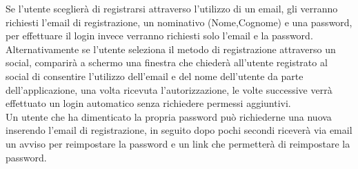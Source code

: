 Se l'utente sceglierà di registrarsi attraverso l'utilizzo di un email, gli verranno richiesti l'email di registrazione, un nominativo (Nome,Cognome) e una password, per effettuare il login invece verranno richiesti solo l'email e la password.\\
Alternativamente se l'utente seleziona il metodo di registrazione attraverso un social, comparirà a schermo una finestra che chiederà all'utente registrato al social di consentire l'utilizzo dell'email e del nome dell'utente da parte dell'applicazione, una volta ricevuta l'autorizzazione, le volte successive verrà effettuato un login automatico senza richiedere permessi aggiuntivi.\\
Un utente che ha dimenticato la propria password può richiederne una nuova inserendo l'email di registrazione, in seguito dopo pochi secondi riceverà via email un avviso per reimpostare la password e un link che permetterà di reimpostare la password.\\



